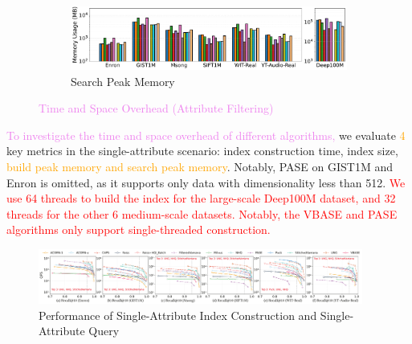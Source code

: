 \documentclass[sigconf, nonacm]{acmart}
\begin{document}
{\begin{figure}[t]
		\begin{subfigure}{\columnwidth}
			\centering
			
			\includegraphics[width=0.99\linewidth]{figures/searchMem/label_memory_comparison.pdf}
			\caption{Search Peak Memory}
			\label{fig:search_memory_mb_comparison}
		\end{subfigure}
		
		\caption{\textcolor{violet}{Time and Space Overhead (Attribute Filtering)}}
		\label{fig:build_index_comparison}
	\end{figure}
	
	
	
	\textcolor{violet}{To investigate the time and space overhead of different algorithms,} we evaluate \textcolor{orange}{4} key metrics in the single-attribute scenario: index construction time, index size, \textcolor{orange}{build peak memory and search peak memory}. Notably, PASE on GIST1M and Enron is omitted, as it supports only data with dimensionality less than 512. \textcolor{red}{We use 64 threads to build the index for the large-scale Deep100M dataset, and 32 threads for the other 6 medium-scale datasets. Notably, the VBASE and PASE algorithms only support single-threaded construction.}
	
	
	\begin{figure}
		\centering
		
		\includegraphics[width=0.95\textwidth]{figures/exp/exp_1_1_SingleLabel_1thread.pdf}
		\caption{Performance of Single-Attribute Index Construction and Single-Attribute Query }
		\label{fig:exp_1_1_SingleLabel_1thread}
	\end{figure}
	
%		
	
}
\end{document}
